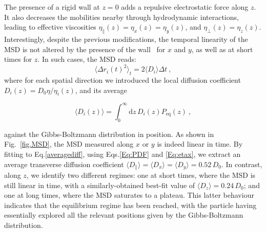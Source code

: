 The presence of a rigid wall at $z=0$ adds a repulsive electrostatic force along $z$. It also decreases the mobilities nearby through hydrodynamic interactions, leading to effective viscosities $\eta_\parallel(z)=\eta_x(z)=\eta_y(z)$, and $\eta_\bot(z) = \eta_z(z)$. Interestingly, despite the previous modifications, the temporal linearity of the MSD is not altered by the presence of the wall~\cite{chubynsky_diffusing_2014,prieve_measurement_1999} for $x$ and $y$, as well as at short times for $z$. In such cases, the MSD reads:
\begin{equation}
	\langle\Delta r_i(t)^2 \rangle_t = 2 \langle D_i \rangle \Delta t\ ,
	\label{averagediff}
\end{equation}
where for each spatial direction we introduced the local diffusion coefficient $D_i(z)=D_0\eta /\eta _i(z)$, and its average 

\begin{equation}
	\langle D_i(z) \rangle = \int_0^{\infty} \textrm{d}z\, D_i(z)P_{\textrm{eq}}(z) ~,
\end{equation}  

against the Gibbs-Boltzmann distribution in position. As shown in Fig.~\ref{fig.MSD}, the MSD measured along $x$ or $y$ is indeed linear in time. By fitting to Eq.\ref{averagediff}, using Eqs.\ref{Eq:PDF} and \ref{Eq:etax}, we extract an average transverse diffusion coefficient $\langle D_\parallel \rangle= \langle D_x\rangle=\langle D_y \rangle= 0.52\, D_0$. In contrast, along $z$, we identify two different regimes: one at short times, where the \gls{MSD} is still linear in time, with a similarly-obtained best-fit value of $\langle D_z \rangle= 0.24\, D_0$; and one at long times, where the MSD saturates to a plateau. This latter behaviour indicates that the equilibrium regime has been reached, with the particle having essentially explored all the relevant positions given by the Gibbs-Boltzmann distribution.

